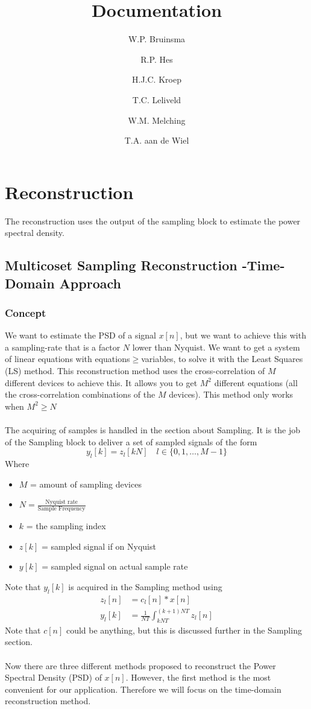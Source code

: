 \documentclass[report, oneside, a4paper, openany]{memoir}
\title{Documentation}
\author{W.P. Bruinsma \and R.P. Hes \and H.J.C. Kroep \and T.C. Leliveld \and W.M. Melching \and T.A. aan de Wiel}
\begin{document}
\chapter{Reconstruction}
The reconstruction uses the output of the sampling block to estimate the power spectral density.

\section{Multicoset Sampling Reconstruction -Time-Domain Approach}
\subsection{Concept}
We want to estimate the PSD of a signal $x[n]$, but we want to achieve this with a sampling-rate that is a factor $N$ lower than Nyquist. 
We want to get a system of linear equations with equations$\geq$variables, to solve it with the Least Squares (LS) method. 
This reconstruction method uses the cross-correlation of $M$ different devices to achieve this. 
It allows you to get $M^2$ different equations (all the cross-correlation combinations of the $M$ devices). This method only works when $M^2\geq N$\\
\\
The acquiring of samples is handled in the section about Sampling. It is the job of the Sampling block to deliver a set of sampled signals of the form 
$$y_l[k] = z_l[kN] \quad l \in \{0,1,\dots, M-1\}$$
Where
\begin{itemize}
\item $M$  = amount of sampling devices
\item $N = \frac{\text{Nyquist rate}}{\text{Sample Frequency}}$
\item $k$ = the sampling index
\item $z[k]$ = sampled signal if on Nyquist
\item $y[k]$ = sampled signal on actual sample rate
\end{itemize}

Note that $y_l[k]$ is acquired in the Sampling method using
\begin{equation*}
\begin{split}
z_l[n] &= c_l[n]\ast x[n]\\
y_l[k] &= \frac{1}{NT}\int_{kNT}^{(k+1)NT} z_l[n]
\end{split}
\end{equation*}
Note that $c[n]$ could be anything, but this is discussed further in the Sampling section.\\
\\
Now there are three different methods proposed to reconstruct the Power Spectral Density (PSD) of $x[n]$. 
However, the first method is the most convenient for our application. 
Therefore we will focus on the time-domain reconstruction method.
\end{document}
